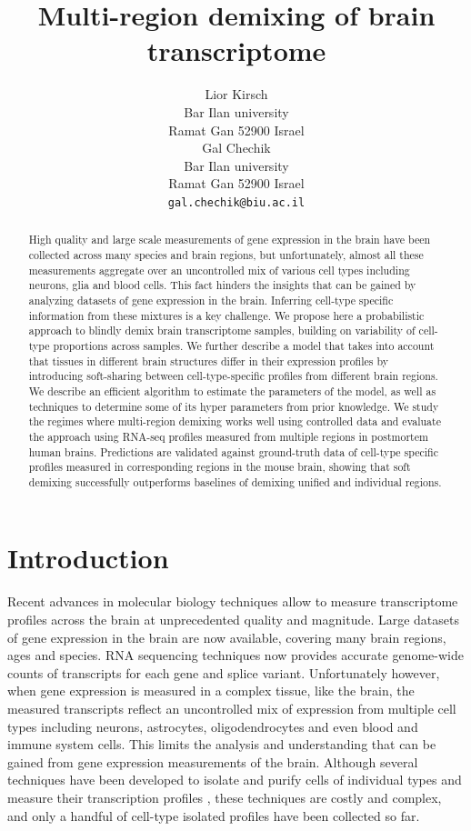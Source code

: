 \documentclass{article} %
\title{Multi-region demixing of brain transcriptome}
\author{
Lior Kirsch \\ Bar Ilan university \\ Ramat Gan 52900 Israel \\ 
\And
Gal Chechik \\ Bar Ilan university \\ Ramat Gan 52900 Israel \\
\texttt{gal.chechik@biu.ac.il} \\
}
\begin{document}
\maketitle
\begin{abstract}
    High quality and large scale measurements of gene expression in the brain have been collected across many species and brain regions, but unfortunately, almost all these measurements aggregate over an uncontrolled mix of various cell types including neurons, glia and blood cells. This fact hinders the insights that can be gained by analyzing datasets of gene expression in the brain. Inferring cell-type specific information from these mixtures is a key challenge. We propose here a probabilistic approach to blindly demix brain transcriptome samples, building on variability of cell-type proportions across samples. We further describe a model that takes into account that tissues in different brain structures differ in their expression profiles by introducing soft-sharing between cell-type-specific profiles from different brain regions. We describe an efficient algorithm to estimate the parameters of the model, as well as techniques to determine some of its hyper parameters from prior knowledge. We study the regimes where multi-region demixing works well using controlled data and evaluate the approach using RNA-seq profiles measured from multiple regions in postmortem human brains. Predictions are validated against ground-truth data of cell-type specific profiles measured in corresponding regions in the mouse brain, showing that soft demixing successfully outperforms baselines of demixing unified and individual regions.
\end{abstract}

\section{Introduction}
\label{introduction}
Recent advances in molecular biology techniques allow to measure transcriptome profiles across the brain at unprecedented quality and magnitude. Large datasets of gene expression in the brain are now available, covering  many brain regions, ages and species. RNA sequencing techniques now provides accurate genome-wide counts of transcripts for each gene and splice variant. Unfortunately however, when gene expression is measured in a complex tissue, like the brain, the measured transcripts reflect an uncontrolled mix of expression from multiple cell types including neurons, astrocytes, oligodendrocytes and even blood and immune system cells. This limits the analysis and understanding that can be gained from gene expression measurements of the brain. Although several techniques have been developed to isolate and purify cells of individual types and measure their transcription profiles \cite{okaty2011cell,barres2014,darmanis2015survey}, these techniques are costly and complex, and only a handful of cell-type isolated profiles have been collected so far. 
\end{document}
